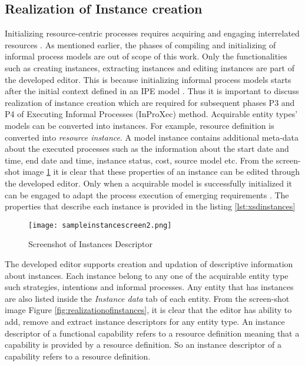\subsection{Realization of Instance creation}
Initializing resource-centric processes requires acquiring and engaging interrelated resources \cite{Sungur2015}. As mentioned earlier, the phases of compiling and initializing of informal process models are out of scope of this work. Only the functionalities such as creating instances, extracting instances and editing instances are part of the developed editor. This is because initializing informal process models starts after the initial context defined in an IPE model \cite{Sungur2015}. Thus it is important to discuss realization of instance creation which are required for subsequent phases P3 and P4 of Executing Informal Processes (InProXec) method. Acquirable entity types' models can be converted into instances. For example, resource definition is converted into \textit{resource instance}. A model instance contains additional meta-data about the executed processes such as the information about the start date and time, end date and time, instance status, cost, source model etc. From the screen-shot image \ref{fig:realizationofinstances2} it is clear that these properties of an instance can be edited through the developed editor. Only when a acquirable model is successfully initialized it can be engaged to adapt the process execution of emerging requirements \cite{Sungur2015}. The properties that describe each instance is provided in the listing \ref{lst:xsdinstances}

\begin{figure}
	\centering
	\texttt{[image: sampleinstancescreen2.png]}
	\caption{Screenshot of Instances Descriptor}
	\label{fig:realizationofinstances2}
\end{figure}

The developed editor supports creation and updation of descriptive information about instances. Each instance belong to any one of the acquirable entity type such strategies, intentions and informal processes. Any entity that has instances are also listed inside the \textit{Instance data} tab of each entity. From the screen-shot image Figure \ref{fig:realizationofinstances}, it is clear that the editor has ability to add, remove and extract instance descriptors for any entity type. An instance descriptor of a functional capability refers to a resource definition meaning that a capability is provided by a resource definition. So an instance descriptor of a capability refers to a resource definition.

